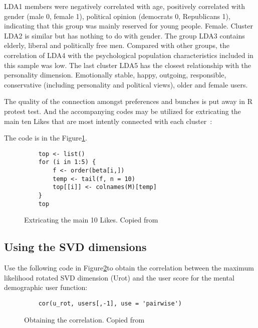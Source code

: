 LDA1 members were negatively correlated with age, positively 
correlated with gender (male 0, female 1), political opinion 
(democrats 0, Republicans 1), indicating that this group was mainly
 reserved for young people. Female. Cluster LDA2 is similar but has
 nothing to do with gender. The group LDA3 contains elderly, 
liberal and politically free men. Compared with other groups, the 
correlation of LDA4 with the psychological population 
characteristics included in this sample was low. The last cluster 
LDA5 has the closest relationship with the personality dimension. 
Emotionally stable, happy, outgoing, responsible, conservative 
(including personality and political views), older and female users.

The quality of the connection amongst preferences and bunches is 
put away in R protest test. And the accompanying codes may be 
utilized for extricating the main ten Likes that are most intently 
connected with each cluster~\cite{hid515-12}:

The code is in the Figure\ref{F:extricate}.

\begin{figure}[htb]
\begin{footnotesize}
\begin{verbatim}
    top <- list()
    for (i in 1:5) {
        f <- order(beta[i,])
        temp <- tail(f, n = 10)
        top[[i]] <- colnames(M)[temp]
    }
    top
\end{verbatim}
\end{footnotesize}
\caption{Extricating the main 10 Likes. Copied from~\cite{hid515-12}}
\label{F:extricate}
\end{figure}


\subsection{Using the SVD dimensions~\cite{hid515-12}}

Use the following code in Figure\ref{F:obtain}to 
obtain the correlation between the maximum 
likelihood rotated SVD dimension (Urot) and the user score for the
 mental demographic user function:

\begin{figure}[htb]
\begin{footnotesize}
\begin{verbatim}
    cor(u_rot, users[,-1], use = 'pairwise')
\end{verbatim}
\end{footnotesize}
\caption{Obtaining the correlation. Copied from~\cite{hid515-12}}
\label{F:obtain}
\end{figure}


